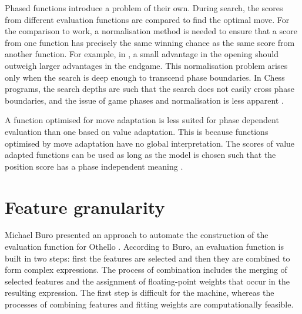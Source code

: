 Phased functions introduce a problem of their own.  During search, the scores from different evaluation functions are compared to find the optimal move.  For the comparison to work,  a normalisation method is needed to ensure that a score from one function has precisely the same winning chance as the same score from another function.  For example, in , a small advantage in the opening should outweigh larger advantages in the endgame.  This normalisation problem arises only when the search is  deep enough to transcend phase boundaries.  In Chess programs, the search depths are such that the search does not easily cross phase boundaries, and the issue of game phases and normalisation is less apparent \cite{schaeffer:reexamination}. 

A function optimised for move adaptation is less suited for phase dependent evaluation than one based on value adaptation. This is because functions optimised by move  adaptation have no global interpretation.  The scores of value adapted functions can be used as long as the model is chosen such that the position score has a phase independent meaning \cite{buro:statistical}.


\section{Feature granularity}
\label{sec:knowledge-granularity}
Michael Buro presented an approach to automate the construction of the evaluation function for Othello \cite{buro:feature}.  According to Buro, an evaluation function is built in two steps: first the features are selected and then they are combined to form complex expressions.  The process of combination includes the merging of selected features and the assignment of floating-point weights that occur in the resulting expression. The first step is difficult for the machine, whereas the processes of combining features and fitting weights are computationally feasible.


